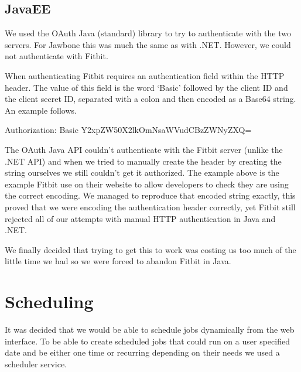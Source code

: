 \subsection{JavaEE}
We used the OAuth Java (standard) library to try to authenticate with the two servers. For Jawbone this was much the same as with .NET. However, we could not authenticate with Fitbit. \par
When authenticating Fitbit requires an authentication field within the HTTP header. The value of this field is the word ‘Basic’ followed by the client ID and the client secret ID, separated with a colon and then encoded as a Base64 string. An example follows. \par
Authorization: Basic Y2xpZW50X2lkOmNsaWVudCBzZWNyZXQ= \par
The OAuth Java API couldn’t authenticate with the Fitbit server (unlike the .NET API) and when we tried to manually create the header by creating the string ourselves we still couldn’t get it authorized. The example above is the example Fitbit use on their website to allow developers to check they are using the correct encoding. We managed to reproduce that encoded string exactly, this proved that we were encoding the authentication header correctly, yet Fitbit still rejected all of our attempts with manual HTTP authentication in Java and .NET. \par
We finally decided that trying to get this to work was costing us too much of the little time we had so we were forced to abandon Fitbit in Java.
\section{Scheduling}
It was decided that we would be able to schedule jobs dynamically from the web interface. To be able to create scheduled jobs that could run on a user specified date and be either one time or recurring depending on their needs we used a scheduler service. 
